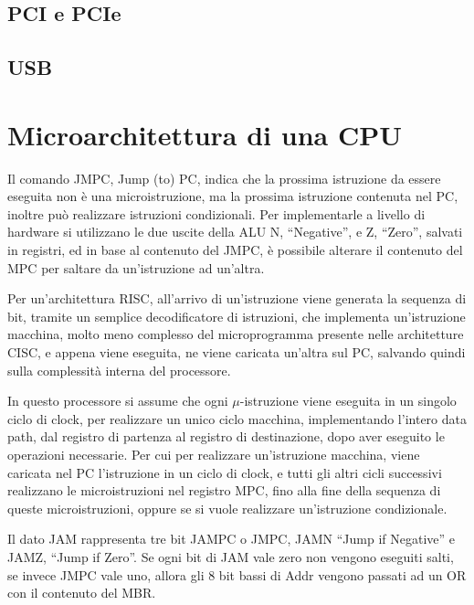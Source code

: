 \documentclass{article}
\numberwithin{equation}{subsection}
\begin{document}
\subsection{PCI e PCIe}

\subsection{USB}

\clearpage

\section{Microarchitettura di una CPU}


Il comando JMPC, Jump (to) PC, indica che la prossima istruzione da essere eseguita non è una microistruzione, ma la prossima istruzione contenuta nel PC, inoltre 
può realizzare istruzioni condizionali. 
Per implementarle a livello di hardware si utilizzano le due uscite della ALU N, ``Negative'', e Z, ``Zero'', salvati in registri, ed in base al contenuto 
del JMPC, è possibile alterare il contenuto del MPC per saltare da un'istruzione ad un'altra. 


Per un'architettura RISC, all'arrivo di un'istruzione viene generata la sequenza di bit, tramite un semplice decodificatore di istruzioni, che implementa un'istruzione macchina, 
molto meno complesso del microprogramma presente nelle architetture CISC, e appena viene eseguita, ne viene caricata un'altra sul PC, salvando quindi sulla complessità interna 
del processore. 



In questo processore si assume che ogni $\mu$-istruzione viene eseguita in un singolo ciclo di clock, per realizzare un unico ciclo macchina, implementando l'intero data 
path, dal registro di partenza al registro di destinazione, dopo aver eseguito le operazioni necessarie. Per cui per realizzare un'istruzione macchina, viene caricata nel 
PC l'istruzione in un ciclo di clock, e tutti gli altri cicli successivi realizzano le microistruzioni nel registro MPC, fino alla fine della sequenza di queste 
microistruzioni, oppure se si vuole realizzare un'istruzione condizionale. 

Il dato JAM rappresenta tre bit JAMPC o JMPC, JAMN ``Jump if Negative'' e JAMZ, ``Jump if Zero''. Se ogni bit di JAM vale zero non vengono eseguiti salti, se invece JMPC vale 
uno, allora gli 8 bit bassi di Addr vengono passati ad un OR con il contenuto del MBR. 
\end{document}
